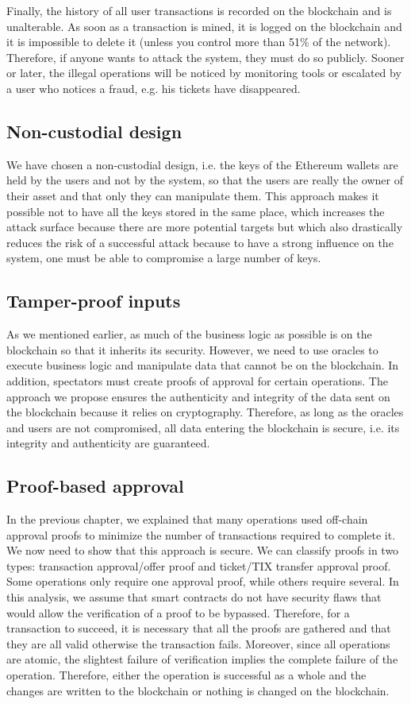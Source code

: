\documentclass[a4paper,11pt,oneside]{report}
\begin{document}
Finally, the history of all user transactions is recorded on the blockchain and is unalterable. As soon as a transaction is mined, it is logged on the blockchain and it is impossible to delete it (unless you control more than 51\% of the network). Therefore, if anyone wants to attack the system, they must do so publicly. Sooner or later, the illegal operations will be noticed by monitoring tools or escalated by a user who notices a fraud, e.g. his tickets have disappeared.

\subsection{Non-custodial design}
We have chosen a non-custodial design, i.e. the keys of the Ethereum wallets are held by the users and not by the system, so that the users are really the owner of their asset and that only they can manipulate them. This approach makes it possible not to have all the keys stored in the same place, which increases the attack surface because there are more potential targets but which also drastically reduces the risk of a successful attack because to have a strong influence on the system, one must be able to compromise a large number of keys.

\subsection{Tamper-proof inputs}
As we mentioned earlier, as much of the business logic as possible is on the blockchain so that it inherits its security. However, we need to use oracles to execute business logic and manipulate data that cannot be on the blockchain. In addition, spectators must create proofs of approval for certain operations. The approach we propose ensures the authenticity and integrity of the data sent on the blockchain because it relies on cryptography. Therefore, as long as the oracles and users are not compromised, all data entering the blockchain is secure, i.e. its integrity and authenticity are guaranteed.

\subsection{Proof-based approval}
In the previous chapter, we explained that many operations used off-chain approval proofs to minimize the number of transactions required to complete it. We now need to show that this approach is secure. We can classify proofs in two types: transaction approval/offer proof and ticket/TIX transfer approval proof. Some operations only require one approval proof, while others require several. In this analysis, we assume that smart contracts do not have security flaws that would allow the verification of a proof to be bypassed. Therefore, for a transaction to succeed, it is necessary that all the proofs are gathered and that they are all valid otherwise the transaction fails. Moreover, since all operations are atomic, the slightest failure of verification implies the complete failure of the operation. Therefore, either the operation is successful as a whole and the changes are written to the blockchain or nothing is changed on the blockchain.
\end{document}

